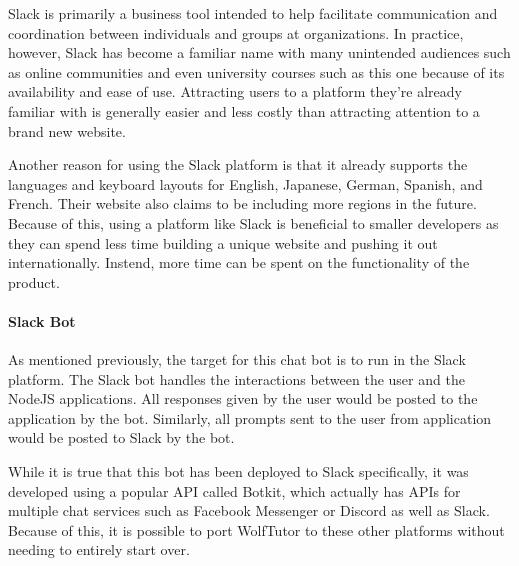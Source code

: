 
Slack is primarily a business tool intended to help facilitate
communication and coordination between individuals and groups at organizations.
In practice, however, Slack has become a familiar name with many unintended audiences such
as online communities and even university courses such as this one because of its 
availability and ease of use. Attracting users to a platform they're already familiar with
is generally easier and less costly than attracting attention to a brand new website.

Another reason for using the Slack platform is that it already supports the languages and keyboard layouts for English, 
Japanese, German, Spanish, and French. Their website also claims to be 
including more regions in the future. Because of this, using a platform like Slack 
is beneficial to smaller developers as they can spend less time building a unique website 
and pushing it out internationally. Instend, more time can be spent on the functionality of the product. 

\paragraph{Slack Bot}
As mentioned previously, the target for this chat bot is to run in the Slack
platform. The Slack bot handles the interactions between the user and the NodeJS applications. 
All responses given by the user would be posted to the application by the bot. 
Similarly, all prompts sent to the user from application would be posted to Slack by the bot.

While it is true that this bot has been deployed to Slack specifically, it was
developed using a popular API called Botkit, which actually has APIs for
multiple chat services such as Facebook Messenger or Discord as well as Slack.
Because of this, it is possible to port WolfTutor to these other platforms
without needing to entirely start over.

